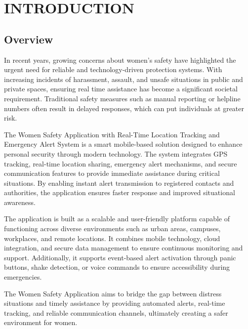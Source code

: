 \documentclass[a4paper,12pt]{report}
\begin{document}

\clearpage
{}
\setcounter{page}{1}


\cleardoublepage
{}  %
\setcounter{chapter}{0} %
\chapter{INTRODUCTION}
\section{Overview}
\par In recent years, growing concerns about women's safety have highlighted the urgent need for reliable and technology-driven protection systems. With increasing incidents of harassment, assault, and unsafe situations in public and private spaces, ensuring real time assistance has become a significant societal requirement. Traditional safety measures such as manual reporting or helpline numbers often result in delayed responses, which can put individuals at greater risk.\\

\par The Women Safety Application with Real-Time Location Tracking and Emergency Alert System is a smart mobile-based solution designed to enhance personal security through modern technology. The system integrates GPS tracking, real-time location sharing, emergency alert mechanisms, and secure communication features to provide immediate assistance during critical situations. By enabling instant alert transmission to
registered contacts and authorities, the application ensures faster response and improved situational awareness.\\

\par The application is built as a scalable and user-friendly platform capable of functioning across diverse environments such as urban areas, campuses, workplaces, and remote
locations. It combines mobile technology, cloud integration, and secure data management to ensure continuous monitoring and support. Additionally, it supports event-based alert
activation through panic buttons, shake detection, or voice commands to ensure accessibility during emergencies.\\

\par The Women Safety Application aims to bridge the gap between distress situations and timely assistance by providing automated alerts, real-time tracking, and reliable communication channels, ultimately creating a safer environment for women.\\
\end{document}
